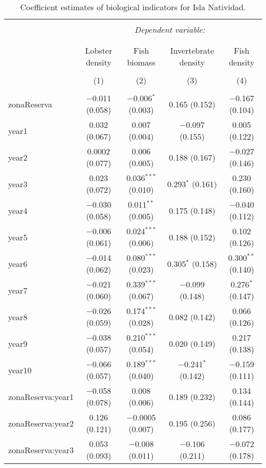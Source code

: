 
\begin{table}[!htbp] \centering 
  \caption{Coefficient estimates of biological indicators for Isla Natividad.} 
  \label{} 
\small 
\begin{tabular}{@{\extracolsep{1pt}}lcccc} 
\\[-1.8ex]\hline 
\hline \\[-1.8ex] 
 & \multicolumn{4}{c}{\textit{Dependent variable:}} \\ 
\cline{2-5} 
\\[-1.8ex] & \multicolumn{4}{c}{} \\ 
 & Lobster density & Fish biomass & Invertebrate density & Fish density \\ 
\\[-1.8ex] & (1) & (2) & (3) & (4)\\ 
\hline \\[-1.8ex] 
 zonaReserva & $-$0.011 (0.058) & $-$0.006$^{*}$ (0.003) & 0.165 (0.152) & $-$0.167 (0.104) \\ 
  year1 & 0.032 (0.067) & 0.007 (0.004) & $-$0.097 (0.155) & 0.005 (0.122) \\ 
  year2 & 0.0002 (0.077) & 0.006 (0.005) & 0.188 (0.167) & $-$0.027 (0.146) \\ 
  year3 & 0.023 (0.072) & 0.036$^{***}$ (0.010) & 0.293$^{*}$ (0.161) & 0.230 (0.160) \\ 
  year4 & $-$0.030 (0.058) & 0.011$^{**}$ (0.005) & 0.175 (0.148) & $-$0.040 (0.112) \\ 
  year5 & $-$0.006 (0.061) & 0.024$^{***}$ (0.006) & 0.188 (0.152) & 0.102 (0.126) \\ 
  year6 & $-$0.014 (0.062) & 0.080$^{***}$ (0.023) & 0.305$^{*}$ (0.158) & 0.300$^{**}$ (0.140) \\ 
  year7 & $-$0.021 (0.060) & 0.339$^{***}$ (0.067) & $-$0.099 (0.148) & 0.276$^{*}$ (0.147) \\ 
  year8 & $-$0.026 (0.059) & 0.174$^{***}$ (0.028) & 0.082 (0.142) & 0.066 (0.126) \\ 
  year9 & $-$0.038 (0.057) & 0.210$^{***}$ (0.054) & 0.020 (0.149) & 0.217 (0.138) \\ 
  year10 & $-$0.066 (0.057) & 0.189$^{***}$ (0.040) & $-$0.241$^{*}$ (0.142) & $-$0.159 (0.111) \\ 
  zonaReserva:year1 & $-$0.058 (0.078) & 0.008 (0.006) & 0.189 (0.232) & 0.134 (0.144) \\ 
  zonaReserva:year2 & 0.126 (0.121) & $-$0.0005 (0.007) & 0.195 (0.256) & 0.086 (0.177) \\ 
  zonaReserva:year3 & 0.053 (0.093) & $-$0.008 (0.011) & $-$0.106 (0.211) & $-$0.072 (0.178) \\ 

\end{tabular}
\end{table}
